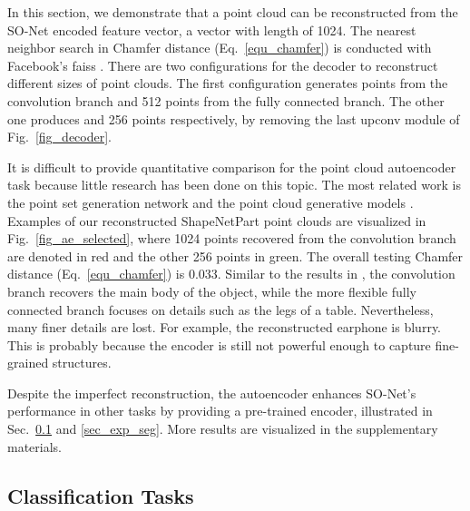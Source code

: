 \documentclass[10pt,twocolumn,letterpaper]{article}
\begin{document}
In this section, we demonstrate that a point cloud can be reconstructed from the SO-Net encoded feature vector, \eg a vector with length of 1024. The nearest neighbor search in Chamfer distance (Eq.~\ref{equ_chamfer}) is conducted with Facebook's faiss \cite{johnson2017billion}. There are two configurations for the decoder to reconstruct different sizes of point clouds. The first configuration generates  points from the convolution branch and 512 points from the fully connected branch. The other one produces  and 256 points respectively, by removing the last upconv module of Fig.~\ref{fig_decoder}.

It is difficult to provide quantitative comparison for the point cloud autoencoder task because little research has been done on this topic. The most related work is the point set generation network \cite{fan2016point} and the point cloud generative models \cite{achlioptas2017learning}. Examples of our reconstructed ShapeNetPart point clouds are visualized in Fig.~\ref{fig_ae_selected}, where 1024 points recovered from the convolution branch are denoted in red and the other 256 points in green. The overall testing Chamfer distance (Eq.~\ref{equ_chamfer}) is 0.033. Similar to the results in \cite{fan2016point}, the convolution branch recovers the main body of the object, while the more flexible fully connected branch focuses on details such as the legs of a table. Nevertheless, many finer details are lost. For example, the reconstructed earphone is blurry. This is probably because the encoder is still not powerful enough to capture fine-grained structures.

Despite the imperfect reconstruction, the autoencoder enhances SO-Net's performance in other tasks by providing a pre-trained encoder, illustrated in Sec.~\ref{sec_exp_cls} and \ref{sec_exp_seg}. More results are visualized in the supplementary materials.


\subsection{Classification Tasks} \label{sec_exp_cls}
\end{document}
